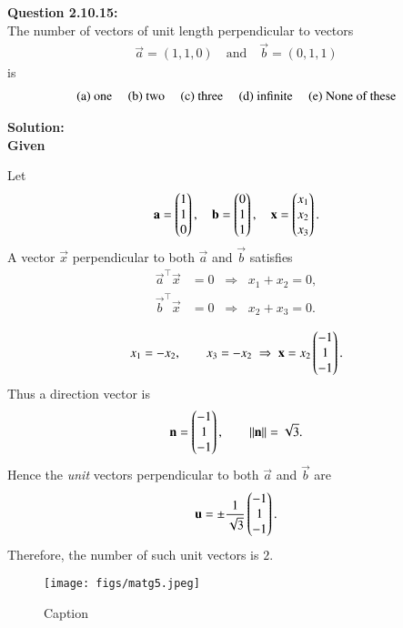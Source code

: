 \documentclass[journal]{IEEEtran}
\begin{document}



\textbf{Question 2.10.15:} \\
The number of vectors of unit length perpendicular to vectors 
\begin{align}
\vec{a} = (1,1,0) \quad \text{and} \quad \vec{b} = (0,1,1)
\end{align}
is
\begin{align}
\text{(a) one \quad (b) two \quad (c) three \quad (d) infinite \quad (e) None of these}
\end{align}

\textbf{Solution:}\\
 \textbf{Given}  
\begin{solution}
Let
\begin{align}
\mathbf{a}=\begin{pmatrix}1\\1\\0\end{pmatrix},\quad 
\mathbf{b}=\begin{pmatrix}0\\1\\1\end{pmatrix}, \quad
\mathbf{x}=\begin{pmatrix}x_1\\x_2\\x_3\end{pmatrix}.
\end{align}
A vector $\vec{x}$ perpendicular to both $\vec{a}$ and $\vec{b}$ satisfies
\begin{align}
\vec{a}^\top\vec{x} &= 0 \;\;\Rightarrow\;\; x_1+x_2=0,
\label{eq:q1-ax0}\\
\vec{b}^\top\vec{x} &= 0 \;\;\Rightarrow\;\; x_2+x_3=0.
\label{eq:q1-bx0}
\end{align}

\begin{align}
x_1=-x_2,\qquad x_3=-x_2
\;\Rightarrow\;
\mathbf{x}=x_2\begin{pmatrix}-1\\1\\-1\end{pmatrix}.
\label{eq:q1-dir}
\end{align}
Thus a direction vector is
\begin{align}
\mathbf{n}=\begin{pmatrix}-1\\1\\-1\end{pmatrix},\qquad 
\|\mathbf{n}\|=\sqrt{3}.
\label{eq:q1-norm}
\end{align}
Hence the \emph{unit} vectors perpendicular to both $\vec{a}$ and $\vec{b}$ are
\begin{align}
\mathbf{u}=\pm\frac{1}{\sqrt{3}}\begin{pmatrix}-1\\1\\-1\end{pmatrix}.
\label{eq:q1-unit}
\end{align}
Therefore, the number of such unit vectors is $\boxed{2}$.
\end{solution}
 
\newpage
\begin{figure}
    \centering
    \texttt{[image: figs/matg5.jpeg]}
    \caption{Caption}
    \label{fig:placeholder}
\end{figure}
\end{document}
